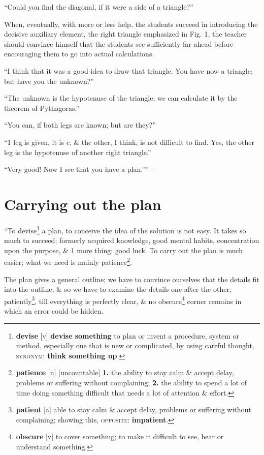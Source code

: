 \documentclass[oneside]{book}
\numberwithin{equation}{section}
\begin{document}
``Could you find the diagonal, if it were a side of a triangle?''

When, eventually, with more or less help, the students succeed in introducing the decisive auxiliary element, the right triangle emphasized in Fig. 1, the teacher should convince himself that the students see sufficiently far ahead before encouraging them to go into actual calculations.

``I think that it was a good idea to draw that triangle. You have now a triangle; but have you the unknown?''

``The unknown is the hypotenuse of the triangle; we can calculate it by the theorem of Pythagoras.''

``You can, if both legs are known; but are they?''

``1 leg is given, it is $c$. \& the other, I think, is not difficult to find. Yes, the other leg is the hypotenuse of another right triangle.''

``Very good! Now I see that you have a plan.'''' -- \cite[pp. 10--12]{Polya2014}

\section{Carrying out the plan}
``To devise\footnote{\textbf{devise} [v] \textbf{devise something} to plan or invent a procedure, system or method, especially one that is new or complicated, by using careful thought, \textsc{synonym}: \textbf{think something up}.} a plan, to conceive the idea of the solution is not easy. It takes so much to succeed; formerly acquired knowledge, good mental habits, concentration upon the purpose, \& 1 more thing: good luck. To carry out the plan is much easier; what we need is mainly patience\footnote{\textbf{patience} [n] [uncountable] \textbf{1.} the ability to stay  calm \& accept delay, problems or suffering without complaining; \textbf{2.} the ability to spend a lot of time doing something difficult that needs a lot of attention \& effort.}.

The plan gives a general outline; we have to convince ourselves that the details fit into the outline, \& so we have to examine the details one after the other, patiently\footnote{\textbf{patient} [a] able to stay calm \& accept delay, problems or suffering without complaining; showing this, \textsc{opposite}: \textbf{impatient}.}, till everything is perfectly clear, \& no obscure\footnote{\textbf{obscure} [v] to cover something; to make it difficult to see, hear or understand something.} corner remains in which an error could be hidden.
\end{document}

